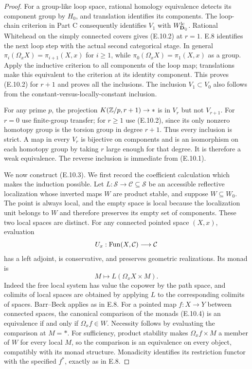 \begin{proof}
For a group-like loop space, rational homology equivalence detects
its component group by $H_0$, and translation identifies its
components.  The loop-chain criterion in Part C consequently
identifies $V_1$ with $W_{\mathbf D_\mathbb Q}^{\mathrm{lc}}$.  Rational
Whitehead on the simply connected covers gives (E.10.2) at
$r=1$.  E.8 identifies the next loop step with the actual
second categorical stage.  In general
$\pi_i(\Omega_xX)=\pi_{i+1}(X,x)$ for $i\ge1$, while
$\pi_0(\Omega_xX)=\pi_1(X,x)$ as a group.  Apply the inductive
criterion to all components of the loop map; translations make
this equivalent to the criterion at its identity component.
This proves (E.10.2) for $r+1$ and proves all the inclusions.
The inclusion $V_1\subset V_0$ also follows from the
constant-versus-locally-constant inclusion.

For any prime $p$, the projection $K(\mathbb Z/p,r+1)\to *$ is in
$V_r$ but not $V_{r+1}$.  For $r=0$ use finite-group transfer;
for $r\ge1$ use (E.10.2), since its only nonzero homotopy
group is the torsion group in degree $r+1$.  Thus every inclusion
is strict.  A map in every $V_r$ is bijective on components and
is an isomorphism on each homotopy group by taking $r$ large
enough for that degree.  It is therefore a weak equivalence.
The reverse inclusion is immediate from (E.10.1).

We now construct (E.10.3). We first record the coefficient calculation
which makes the induction possible. Let
$L:\mathcal S\to\mathcal C\subseteq\mathcal S$ be an accessible
reflective localization whose inverted maps $W$ are product stable,
and suppose $W\subseteq W_0$. The point is always local, and
the empty space is local because the localization unit belongs to
$W$ and therefore preserves its empty set of components. These
two local spaces are distinct. For any connected pointed
space $(X,x)$, evaluation
\[
 U_x:\operatorname{Fun}(X,\mathcal C)\longrightarrow\mathcal C
\]
has a left adjoint, is conservative, and preserves geometric
realizations. Its monad is
\[
                  M\longmapsto L(\Omega_xX\times M).
 \tag{E.10.4}
\]
Indeed the free local system has value the copower by the path
space, and colimits of local spaces are obtained by applying $L$
to the corresponding colimits of spaces. Barr--Beck applies as in
E.8. For a pointed map $f:X\to Y$ between connected spaces, the canonical comparison of
the monads (E.10.4) is an equivalence if and only if
$\Omega_xf\in W$. Necessity follows by evaluating the comparison
at $M=*$. For sufficiency, product stability makes
$\Omega_xf\times M$ a member of $W$ for every local $M$,
so the comparison is an equivalence on every object, compatibly
with its monad structure. Monadicity identifies its restriction
functor with the specified $f^*$, exactly as in E.8.


\end{proof}
